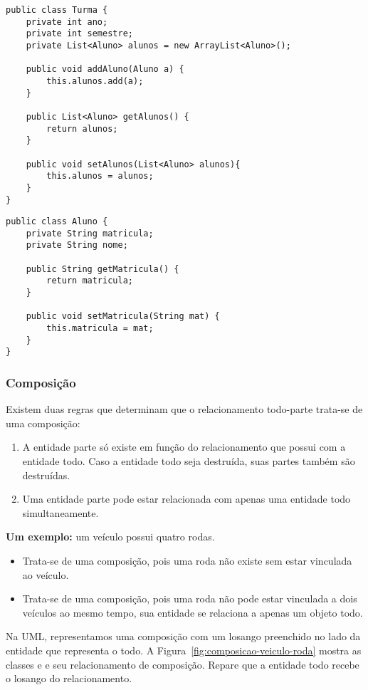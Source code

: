 \begin{verbatim}
public class Turma {
	private int ano;
	private int semestre;
	private List<Aluno> alunos = new ArrayList<Aluno>();
	
	public void addAluno(Aluno a) {
		this.alunos.add(a);
	}
	
	public List<Aluno> getAlunos() {
		return alunos;
	}
	
	public void setAlunos(List<Aluno> alunos){
		this.alunos = alunos;
	}
}
\end{verbatim}
 
\begin{verbatim}
public class Aluno {
	private String matricula;
	private String nome;
	
	public String getMatricula() {
		return matricula;
	}

	public void setMatricula(String mat) {
		this.matricula = mat;
	}
}
\end{verbatim}
 
\subsubsection{Composição}
Existem duas regras que determinam que o relacionamento todo-parte trata-se de uma composição:

\begin{enumerate}
	\item A entidade parte só existe em função do relacionamento que possui com a entidade todo. Caso a entidade todo seja destruída, suas partes também são destruídas.
	\item Uma entidade parte pode estar relacionada com apenas uma entidade todo simultaneamente.
\end{enumerate}

\textbf{Um exemplo:} um veículo possui quatro rodas.
\begin{itemize}
	\item Trata-se de uma composição, pois uma roda não existe sem estar vinculada ao veículo.
	\item Trata-se de uma composição, pois uma roda não pode estar vinculada a dois veículos ao mesmo tempo, sua entidade se relaciona a apenas um objeto todo.
\end{itemize}

Na UML, representamos uma composição com um losango preenchido no lado da entidade que representa o todo. A Figura~\ref{fig:composicao-veiculo-roda} mostra as classes  e  e seu relacionamento de composição. Repare que a entidade todo recebe o losango do relacionamento.

